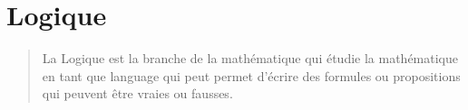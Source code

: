 \part{Logique}

\vspace{5em}

\begin{quote}
    La Logique est la branche de la mathématique qui étudie la mathématique en tant que language qui peut permet d'écrire des formules ou propositions qui peuvent être vraies ou fausses.
\end{quote}

